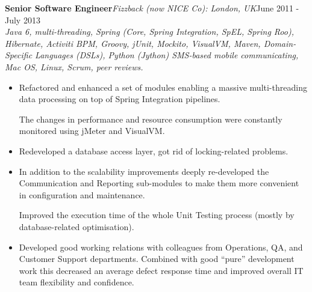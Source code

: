 \documentclass{res}
\newcommand{\jobdes}[4]{\needspace{3\baselineskip} %
{\noindent \bf #3\hspace{2ex}}{{\em \small #1}}{\hfill #2}\\{{\it \small #4.}}}
\newif\ifFullVersion
\begin{document}
\begin{resume}
\jobdes{Fizzback (now NICE Co): London, UK} {June 2011 - July 2013}{Senior Software Engineer}
{Java 6, multi-threading, Spring (Core, Spring Integration, SpEL, Spring Roo), Hibernate, Activiti BPM, Groovy, jUnit, Mockito, VisualVM, Maven, Domain-Specific Languages (DSLs), Python (Jython) SMS-based mobile communicating, Mac OS, Linux, Scrum, peer reviews}
\begin{itemize} \itemsep -2pt %
 \item Refactored and enhanced a set of modules enabling a massive multi-threading data processing on top of Spring Integration pipelines.
\ifFullVersion
While for some modules it was enough to re-code the critical pieces with the standard “stateless or immutable” approach, the main part of existed system required deep re-design based on Enterprise Integration Patterns (EIP) messaging-based architecture and extensive use of Java multi-threading tools.
\fi
The changes in performance and resource consumption were constantly monitored using jMeter and VisualVM.
 \item Redeveloped a database access layer, got rid of locking-related problems.
\ifFullVersion
Some modules were completely re-built until the required level of performance and reliability was achieved.
\fi
 \item In addition to the scalability improvements deeply re-developed the Communication and Reporting sub-modules to make them more convenient in configuration and maintenance.
\ifFullVersion
   These changes (like introducing ad-hoc configuration DSL and flexible report templates) greatly improved overall system's maintainability and customer provisioning time.
\fi
Improved the execution time of the whole Unit Testing process (mostly by database-related optimisation).
\ifFullVersion
Initiated use of CI service (Jenkins) as a key component of the team’s Scrum Agile methodology approach.
\fi
 \item Developed good working relations with colleagues from Operations, QA, and Customer Support departments. Combined with good ``pure'' development work this decreased an average defect response time and improved overall IT team flexibility and confidence.
\end{itemize}


\end{resume}
\end{document}
